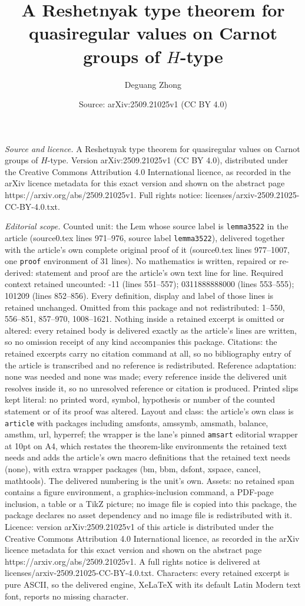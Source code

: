 \documentclass[10pt,a4paper]{amsart}
\title[A Reshetnyak type theorem for quasiregular values on Carnot ]{A Reshetnyak type theorem for quasiregular values on Carnot groups of $H$-type}
\author{Deguang Zhong}
\date{Source: arXiv:2509.21025v1 (CC BY 4.0)}
\begin{document}
\maketitle

\noindent\emph{Source and licence.} A Reshetnyak type theorem for quasiregular values on Carnot groups of $H$-type. Version arXiv:2509.21025v1 (CC BY 4.0), distributed under the Creative Commons Attribution 4.0 International licence, as recorded in the arXiv licence metadata for this exact version and shown on the abstract page https://arxiv.org/abs/2509.21025v1. Full rights notice: licenses/arxiv-2509.21025-CC-BY-4.0.txt.\par\smallskip

\noindent\textit{Editorial scope.} Counted unit: the Lem whose source label is \texttt{lemma3522} in the article (source0.tex lines 971--976, source label \texttt{lemma3522}), delivered together with the article's own complete original proof of it (source0.tex lines 977--1007, one \texttt{proof} environment of 31 lines). No mathematics is written, repaired or re-derived: statement and proof are the article's own text line for line. Required context retained uncounted: -11 (lines 551--557); 0311888888000 (lines 553--555); 101209 (lines 852--856). Every definition, display and label of those lines is retained unchanged. Omitted from this package and not redistributed: 1--550, 556--851, 857--970, 1008--1621. Nothing inside a retained excerpt is omitted or altered: every retained body is delivered exactly as the article's lines are written, so no omission receipt of any kind accompanies this package. Citations: the retained excerpts carry no citation command at all, so no bibliography entry of the article is transcribed and no reference is redistributed. Reference adaptation: none was needed and none was made; every reference inside the delivered unit resolves inside it, so no unresolved reference or citation is produced. Printed slips kept literal: no printed word, symbol, hypothesis or number of the counted statement or of its proof was altered. Layout and class: the article's own class is \texttt{article} with packages including amsfonts, amssymb, amsmath, balance, amsthm, url, hyperref; the wrapper is the lane's pinned \texttt{amsart} editorial wrapper at 10pt on A4, which restates the theorem-like environments the retained text needs and adds the article's own macro definitions that the retained text needs (none), with extra wrapper packages (bm, bbm, dsfont, xspace, cancel, mathtools). The delivered numbering is the unit's own. Assets: no retained span contains a figure environment, a graphics-inclusion command, a PDF-page inclusion, a table or a TikZ picture; no image file is copied into this package, the package declares no asset dependency and no image file is redistributed with it. Licence: version arXiv:2509.21025v1 of this article is distributed under the Creative Commons Attribution 4.0 International licence, as recorded in the arXiv licence metadata for this exact version and shown on the abstract page https://arxiv.org/abs/2509.21025v1. A full rights notice is delivered at licenses/arxiv-2509.21025-CC-BY-4.0.txt. Characters: every retained excerpt is pure ASCII, so the delivered engine, XeLaTeX with its default Latin Modern text font, reports no missing character.
\end{document}
